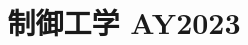 \documentclass[11pt,a4paper]{article}
\title{制御工学 AY2023}
\author{}
\date{}
\begin{document}
\maketitle


\bigskip

\end{document}
